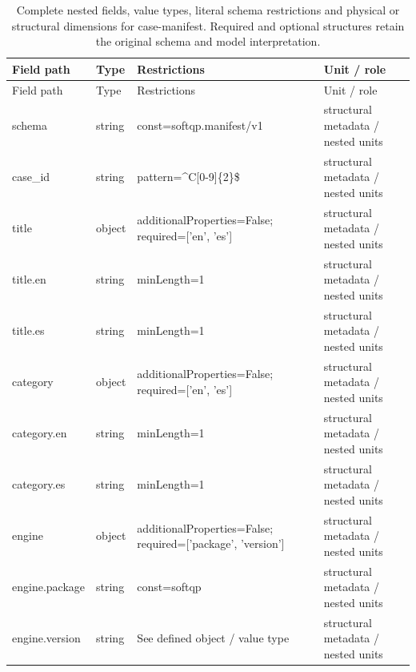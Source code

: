 \begingroup\footnotesize\setlength{\tabcolsep}{3pt}
\begin{longtable}{@{}>{\raggedright\arraybackslash}p{}>{\raggedright\arraybackslash}p{}>{\raggedright\arraybackslash}p{}>{\raggedright\arraybackslash}p{}@{}}
\caption{Complete nested fields, value types, literal schema restrictions and physical or structural dimensions for case-manifest. Required and optional structures retain the original schema and model interpretation.}\label{tab:nested-case-manifest}\\
\toprule Field path & Type & Restrictions & Unit / role\\\midrule\endfirsthead
\toprule Field path & Type & Restrictions & Unit / role\\\midrule\endhead
\bottomrule\endfoot
schema & string & const=\allowbreak{}softqp.\allowbreak{}manifest/\allowbreak{}v1 & structural metadata /\allowbreak{} nested units\\
case\_\allowbreak{}id & string & pattern=\allowbreak{}\textasciicircum{}C[0-9]\{2\}\$ & structural metadata /\allowbreak{} nested units\\
title & object & additionalProperties=\allowbreak{}False; required=\allowbreak{}['en', 'es'] & structural metadata /\allowbreak{} nested units\\
title.\allowbreak{}en & string & minLength=\allowbreak{}1 & structural metadata /\allowbreak{} nested units\\
title.\allowbreak{}es & string & minLength=\allowbreak{}1 & structural metadata /\allowbreak{} nested units\\
category & object & additionalProperties=\allowbreak{}False; required=\allowbreak{}['en', 'es'] & structural metadata /\allowbreak{} nested units\\
category.\allowbreak{}en & string & minLength=\allowbreak{}1 & structural metadata /\allowbreak{} nested units\\
category.\allowbreak{}es & string & minLength=\allowbreak{}1 & structural metadata /\allowbreak{} nested units\\
engine & object & additionalProperties=\allowbreak{}False; required=\allowbreak{}['package', 'version'] & structural metadata /\allowbreak{} nested units\\
engine.\allowbreak{}package & string & const=\allowbreak{}softqp & structural metadata /\allowbreak{} nested units\\
engine.\allowbreak{}version & string & See defined object /\allowbreak{} value type & structural metadata /\allowbreak{} nested units\\

\end{longtable}
